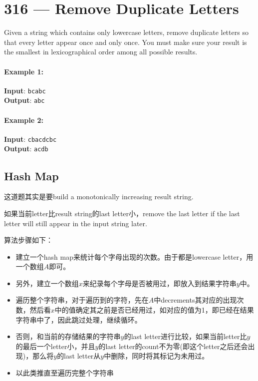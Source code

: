 \section{316 --- Remove Duplicate Letters}
Given a string which contains only lowercase letters, remove duplicate letters so that every letter appear once and only once. You must make sure your result is the smallest in lexicographical order among all possible results.

\paragraph{Example 1:}

\begin{flushleft}
\textbf{Input}: \texttt{bcabc}
\\
\textbf{Output}: \texttt{abc}
\end{flushleft}

\paragraph{Example 2:}

\begin{flushleft}
\textbf{Input}: \texttt{cbacdcbc}
\\
\textbf{Output}: \texttt{acdb}
\end{flushleft}
\subsection{Hash Map}
这道题其实是要build a monotonically increasing result string.
\par
如果当前letter比result string的last letter小，remove the last letter if the last letter will still appear in the input string later.
\par
算法步骤如下：
\begin{itemize}
\item 建立一个hash map来统计每个字母出现的次数。由于都是lowercase letter，用一个数组$A$即可。
\item 另外，建立一个数组$ x $来纪录每个字母是否被用过，即放入到结果字符串$y$中。
\item 遍历整个字符串，对于遍历到的字符，先在$ A $中decrements其对应的出现次数，然后看$ x $中的值确定其之前是否已经用过，如对应的值为1，即已经在结果字符串中了，因此跳过处理，继续循环。
\item 否则，和当前的存储结果的字符串$y$的last letter进行比较，如果当前letter比$y$的最后一个letter小，并且$y$的last letter的count不为零(即这个letter之后还会出现)，那么将$y$的last letter从$ y $中删除，同时将其标记为未用过。
\item 以此类推直至遍历完整个字符串
\end{itemize}

